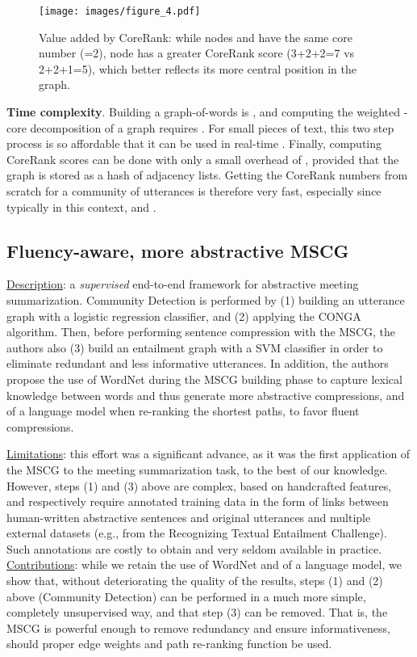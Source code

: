 \documentclass[11pt,a4paper]{article}
\begin{document}
\begin{figure}[t]
\centering
\texttt{[image: images/figure\_4.pdf]}
\captionsetup{size=small}
\caption{Value added by CoreRank: while nodes  and  have the same core number (=2), node  has a greater CoreRank score (3+2+2=7 vs 2+2+1=5), which better reflects its more central position in the graph.}
\label{fig:core_rank_illustration}
\end{figure}

\noindent \textbf{Time complexity}. Building a graph-of-words is , and computing the weighted -core decomposition of a graph requires  \cite{batagelj2002}. For small pieces of text, this two step process is so affordable that it can be used in real-time \cite{meladianos2017real}. Finally, computing CoreRank scores can be done with only a small overhead of , provided that the graph is stored as a hash of adjacency lists. Getting the CoreRank numbers from scratch for a community of utterances is therefore very fast, especially since typically in this context,  and .

\subsection{Fluency-aware, more abstractive MSCG \cite{mehdad2013abstractive}}\label{sub:mehdad}
\underline{Description}: a \textit{supervised} end-to-end framework for abstractive meeting summarization. Community Detection is performed by (1) building an utterance graph with a logistic regression classifier, and (2) applying the CONGA algorithm. Then, before performing sentence compression with the MSCG, the authors also (3) build an entailment graph with a SVM classifier in order to eliminate redundant and less informative utterances. In addition, the authors propose the use of WordNet \cite{miller1995wordnet} during the MSCG building phase to capture lexical knowledge between words and thus generate more abstractive compressions, and of a language model when re-ranking the shortest paths, to favor fluent compressions.

\noindent \underline{Limitations}: this effort was a significant advance, as it was the first application of the MSCG to the meeting summarization task, to the best of our knowledge. However, steps (1) and (3) above are complex, based on handcrafted features, and respectively require annotated training data in the form of links between human-written abstractive sentences and original utterances and multiple external datasets (e.g., from the Recognizing Textual Entailment Challenge). Such annotations are costly to obtain and very seldom available in practice.\\
\underline{Contributions}: while we retain the use of WordNet and of a language model, we show that, without deteriorating the quality of the results, steps (1) and (2) above (Community Detection) can be performed in a much more simple, completely unsupervised way, and that step (3) can be removed. That is, the MSCG is powerful enough to remove redundancy and ensure informativeness, should proper edge weights and path re-ranking function be used.\\
\end{document}
